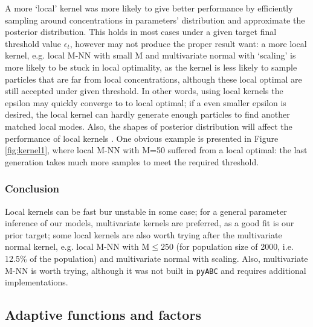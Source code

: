 A more `local' kernel was more likely to give better performance by efficiently sampling around concentrations in parameters' distribution and approximate the posterior distribution. This holds in most cases under a given target final threshold value $\epsilon_t$, however may not produce the proper result want: a more local kernel, e.g. local M-NN with small M and multivariate normal with `scaling' is more likely to be stuck in local optimality, as the kernel is less likely to sample particles that are far from local concentrations, although these local optimal are still accepted under given threshold. In other words, using local kernels the epsilon may quickly converge to to local optimal; if a even smaller epsilon is desired, the local kernel can hardly generate enough particles to find another matched local modes. Also, the shapes of posterior distribution will affect the performance of local kernels \cite{ref:kernel}. One obvious example is presented in Figure \ref{fig:kernel1}, where local M-NN with M=50 suffered from a local optimal: the last generation takes much more samples to meet the required threshold.

\subsubsection{Conclusion} Local kernels can be fast bur unstable in some case; for a general parameter inference of our models, multivariate kernels are preferred, as a good fit is our prior target; some local kernels are also worth trying after the multivariate normal kernel, e.g. local M-NN with M$\leq 250$ (for population size of 2000, i.e. 12.5\% of the population) and multivariate normal with scaling. Also, multivariate M-NN is worth trying, although it was not built in \verb|pyABC| and requires additional implementations.






\subsection{Adaptive functions and factors}

